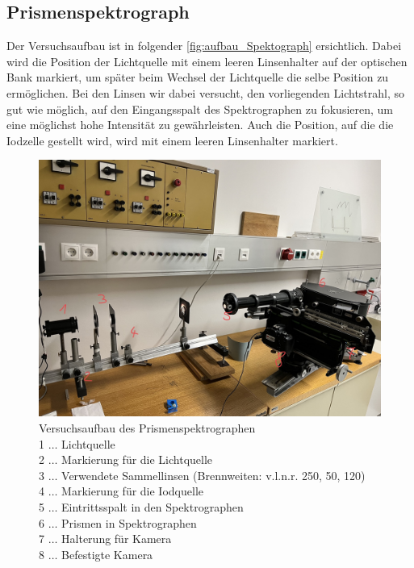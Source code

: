 \documentclass[12pt,english,ngerman]{scrartcl}
\begin{document}
\subsection{Prismenspektrograph}

Der Versuchsaufbau ist in folgender \autoref{fig:aufbau_Spektograph}
ersichtlich. Dabei wird die Position der Lichtquelle mit einem leeren
Linsenhalter auf der optischen Bank markiert, um später beim Wechsel der
Lichtquelle die selbe Position zu ermöglichen. Bei den Linsen wir dabei
versucht, den vorliegenden Lichtstrahl, so gut wie möglich, auf den
Eingangsspalt des Spektrographen zu fokusieren, um eine möglichst hohe
Intensität zu gewährleisten. Auch die Position, auf die die Iodzelle gestellt
wird, wird mit einem leeren Linsenhalter markiert.

\begin{figure}[H]
	\begin{center}
		\includegraphics[width =\textwidth]{./figures/Spektograph.png}
	\end{center}
	\caption[Versuchsaufbau des Prismenspektrographen] {Versuchsaufbau des
		Prismenspektrographen                                                    \\
		1 \(\dots\) Lichtquelle                                                  \\
		2 \(\dots\) Markierung für die Lichtquelle                               \\
		3 \(\dots\) Verwendete Sammellinsen (Brennweiten: v.l.n.r. 250, 50, 120) \\
		4 \(\dots\) Markierung für die Iodquelle                                 \\
		5 \(\dots\) Eintrittsspalt in den Spektrographen                         \\
		6 \(\dots\) Prismen in Spektrographen                                    \\
		7 \(\dots\) Halterung für Kamera                                         \\
		8 \(\dots\) Befestigte Kamera
	}\label{fig:aufbau_Spektograph}
\end{figure}
\end{document}
